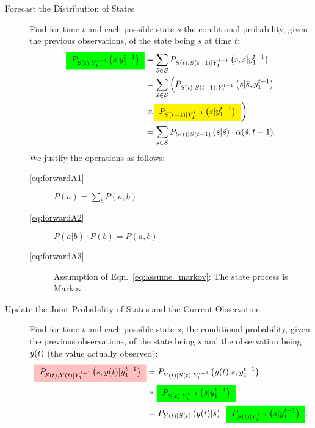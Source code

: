 \begin{description}
\item[Forecast the Distribution of States] Find for time $t$ and each
  possible state $s$ the conditional probability, given the
  previous observations, of the state being $s$ at time $t$:
  \begin{subequations}
    \label{eq:forwardA}
    \begin{align}
      \mlabel{eq:forwardA1}
      \prealpha & = \sum_{{\tilde s}\in\states}
      P_{\ti{S}{t},\ti{S}{t-1}|\ts{Y}{1}{t-1}} \left( s, {\tilde s}
      |\ts{y}{1}{t-1} \right)\\
      \mlabel{eq:forwardA2}
      & = \sum_{{\tilde s}\in\states} \left(
        P_{\ti{S}{t}|\ti{S}{t-1},\ts{Y}{1}{t-1}}
        \left( s|{\tilde s},\ts{y}{1}{t-1} \right) \right. \nonumber \\ &
      \left. \times \alphax{t-1}{{\tilde s}} \right) \\
      \mlabel{eq:forwardA3}
      & = \sum_{{\tilde s}\in\states} P_{\ti{S}{t}|\ti{S}{t-1}} \left( s|{\tilde s} \right)
      \cdot \alpha({\tilde s},t-1) .
    \end{align}
  \end{subequations}
  We justify the operations as follows:
  \begin{description}
  \item[\eqref{eq:forwardA1}] $P(a) = \sum_b P(a,b)$
  \item[\eqref{eq:forwardA2}] $P(a|b)\cdot P(b) = P(a,b)$
  \item[\eqref{eq:forwardA3}] Assumption of
    Eqn.~\eqref{eq:assume_markov}: The state process is Markov
  \end{description}
\item[Update the Joint Probability of States and the Current
  Observation] Find for time $t$ and each possible state $s$, the
  conditional probability, given the previous observations, of the
  state being $s$ and the observation being ${y}{(t)}$ (the value
  actually observed):
  \begin{subequations}
    \label{eq:forwardB}
    \begin{align}
      \mlabel{eq:forwardB1}
      \pregamma &= P_{\ti{Y}{t} |
        \ti{S}{t},\ts{Y}{1}{t-1}}\left(\ti{y}{t} |s, \ts{y}{1}{t-1}
      \right) \nonumber \\& \times \prealpha\\
      \mlabel{eq:forwardB2}
      &= P_{\ti{Y}{t} | \ti{S}{t}}\left(\ti{y}{t} |s \right) \cdot
      \prealpha .
    \end{align}

\end{subequations}
\end{description}
